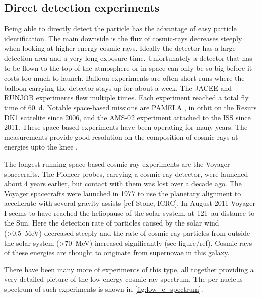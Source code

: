 \subsection{Direct detection experiments}

Being able to directly detect the particle has the advantage of easy particle identification. The main downside is the flux of cosmic-rays decreases steeply when looking at higher-energy cosmic rays. Ideally the detector has a large detection area and a very long exposure time. Unfortunately a detector that has to be flown to the top of the atmosphere or in space can only be so big before it costs too much to launch. Balloon experiments are often short runs where the balloon carrying the detector stays up for about a week. The JACEE \cite{asakimori1998jacee} and RUNJOB \cite{hareyama2011runjob} experiments flew multiple times. Each experiment reached a total fly time of \SI{60}{\day}. Notable space-based missions are PAMELA \cite{adriani2014pamela}, in orbit on the Resurs DK1 sattelite since 2006, and the AMS-02 \cite{casaus2014ams} experiment attached to the ISS since 2011. These space-based experiments have been operating for many years. The measurements provide good resolution on the composition of cosmic rays at energies upto the knee \cite{kulikov1958knee}.

The longest running space-based cosmic-ray experiments are the Voyager spacecrafts. The Pioneer probes, carrying a cosmic-ray detector, were launched about 4 years earlier, but contact with them was lost over a decade ago. The Voyager spacecrafts were launched in 1977 to use the planetary alignment to accellerate with several gravity assists [ref Stone, ICRC]. In August 2011 Voyager I seems to have reached the heliopause of the solar system, at \SI{121}{\astronomicalunit} distance to the Sun. Here the detection rate of particles caused by the solar wind (>\SI{0.5}{\MeV}) decreased steeply and the rate of cosmic-ray particles from outside the solar system (>\SI{70}{\MeV}) increased significantly (see figure/ref). Cosmic rays of these energies are thought to originate from supernovae in this galaxy.

There have been many more of experiments of this type, all together providing a very detailed picture of the low energy cosmic-ray spectrum. The per-nucleus spectrum of such experiments is shown in \cref{fig:low_e_spectrum}.

